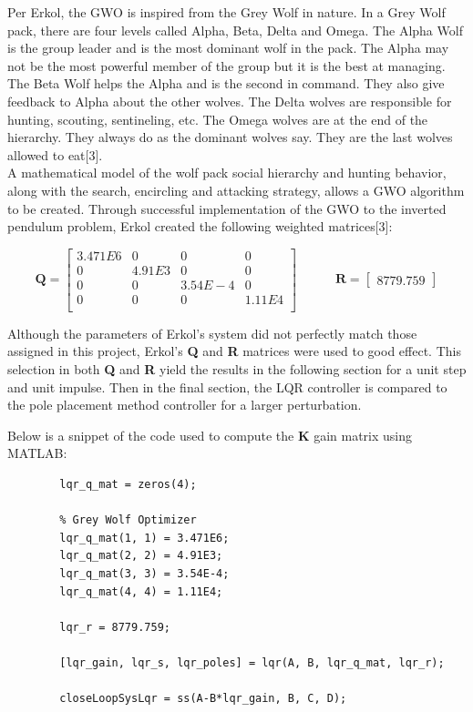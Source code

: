 \documentclass[titlepage]{article}
\begin{document}
Per Erkol, the GWO is inspired from the Grey Wolf in nature. In a Grey Wolf pack, there are four levels called Alpha, Beta, Delta and Omega. The Alpha Wolf is the group leader and is the most dominant wolf in the pack. The Alpha may not be the most powerful member of the group but it is the best at managing. The Beta Wolf helps the Alpha and is the second in command. They also give feedback to Alpha about the other wolves. The Delta wolves are responsible for hunting, scouting, sentineling, etc. The Omega wolves are at the end of the hierarchy. They always do as the dominant wolves say. They are the last wolves allowed to eat[3].\\

A mathematical model of the wolf pack social hierarchy and hunting behavior, along with the search, encircling and attacking strategy, allows a GWO algorithm to be created. Through successful implementation of the GWO to the inverted pendulum problem, Erkol created the following weighted matrices[3]:

\begin{equation}
		\textbf{Q}=\begin{bmatrix}
			3.471E6 & 0 & 0 & 0\\
			0 & 4.91E3 & 0 & 0\\
			0 & 0 & 3.54E-4 & 0\\
			0 & 0 & 0 & 1.11E4\\
		\end{bmatrix}
		\quad\quad\quad\textbf{R} =
		\begin{bmatrix}
			8779.759
		\end{bmatrix}
\end{equation}

Although the parameters of Erkol’s system did not perfectly match those assigned in this project, Erkol’s \textbf{Q} and \textbf{R} matrices were used to good effect. This selection in both \textbf{Q} and \textbf{R} yield the results in the following section for a unit step and unit impulse. Then in the final section, the LQR controller is compared to the pole placement method controller for a larger perturbation.

	Below is a snippet of the code used to compute the \textbf{K} gain matrix using MATLAB:
	\begin{lstlisting}[style=Matlab-editor]
		%% LQR Controller
		lqr_q_mat = zeros(4);

		% Grey Wolf Optimizer
		lqr_q_mat(1, 1) = 3.471E6;
		lqr_q_mat(2, 2) = 4.91E3;
		lqr_q_mat(3, 3) = 3.54E-4;
		lqr_q_mat(4, 4) = 1.11E4;

		lqr_r = 8779.759;

		[lqr_gain, lqr_s, lqr_poles] = lqr(A, B, lqr_q_mat, lqr_r);

		closeLoopSysLqr = ss(A-B*lqr_gain, B, C, D);
	\end{lstlisting}
\end{document}
